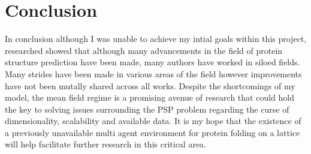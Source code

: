 \section{Conclusion}
In conclusion although I was unable to achieve my intial goals within this project,
researched showed that although many advancements
in the field of protein structure prediction have been made, many
authors have worked in siloed fields. Many strides have been made in various areas of the 
field however improvements have not been mutally shared across all works.
Despite the shortcomings of my model, the mean field regime is a promising
avenue of research that could hold the key to solving issues surrounding
the PSP problem regarding the curse of dimensionality, scalability and 
available data. It is my hope that the existence of a 
previously unavailable multi agent environment
for protein folding on a lattice will help
facilitate further research in this critical area.